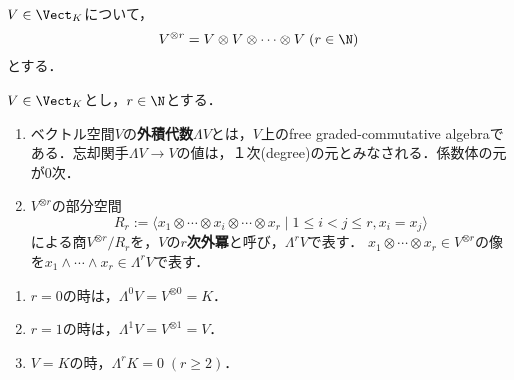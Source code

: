 \documentclass[uplatex, dvipdfmx]{jsreport}
\begin{document}
\begin{notation}
    $V\in\Vect_K$について，
    \[V^{\otimes r}=V\otimes V\otimes\cdots\otimes V\;(r\in\N)\]
    とする．
\end{notation}

\begin{definition}
    $V\in\Vect_K$とし，$r\in\N$とする．
    \begin{enumerate}
        \item ベクトル空間$V$の\textbf{外積代数}$\Lambda V$とは，$V$上のfree graded-commutative algebraである．忘却関手$\Lambda V\to V$の値は，１次(degree)の元とみなされる．係数体の元が$0$次．
        \item $V^{\otimes r}$の部分空間
        \[R_r:=\langle x_1\otimes\cdots\otimes x_i\otimes\cdots\otimes x_r\mid 1\le i<j\le r,x_i=x_j\rangle\]
        による商$V^{\otimes r}/R_r$を，$V$の\textbf{$r$次外冪}と呼び，$\Lambda^rV$で表す．
        $x_1\otimes\cdots\otimes x_r\in V^{\otimes r}$の像を$x_1\wedge\cdots\wedge x_r\in\Lambda^rV$で表す．
    \end{enumerate}
\end{definition}
\begin{example}\mbox{}
    \begin{enumerate}
        \item $r=0$の時は，$\Lambda^0V=V^{\otimes 0}=K$．
        \item $r=1$の時は，$\Lambda^1V=V^{\otimes 1}=V$．
        \item $V=K$の時，$\Lambda^rK=0\;(r\ge 2)$．
    \end{enumerate}
\end{example}
\end{document}
